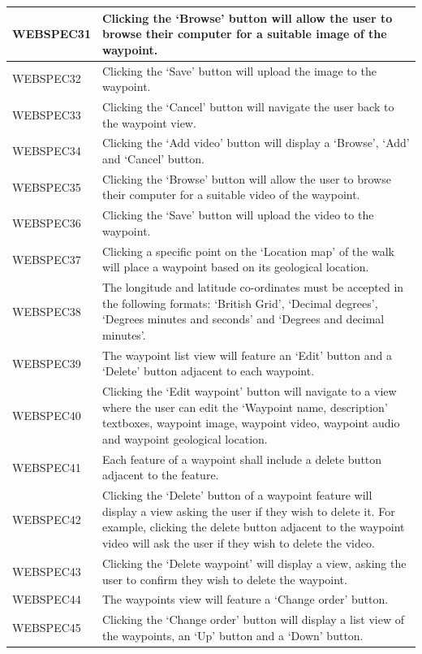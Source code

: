 \documentclass[11pt,a4paper]{article}
\begin{document}
\begin{longtable}{|p{2.5cm}p{13cm}|}
WEBSPEC31 & Clicking the `Browse' button will allow the user to browse their computer for a suitable image of the waypoint. \\ \hline
WEBSPEC32 & Clicking the `Save' button will upload the image to the waypoint. \\ \hline
WEBSPEC33 & Clicking the `Cancel' button will navigate the user back to the waypoint view. \\ \hline
WEBSPEC34 & Clicking the `Add video' button will display a `Browse', `Add' and `Cancel' button. \\ \hline
WEBSPEC35 & Clicking the `Browse' button will allow the user to browse their computer for a suitable video of the waypoint. \\ \hline
WEBSPEC36 & Clicking the `Save' button will upload the video to the waypoint. \\ \hline
WEBSPEC37 & Clicking a specific point on the `Location map' of the walk will place a waypoint based on its geological location. \\ \hline
WEBSPEC38 & The longitude and latitude co-ordinates must be accepted in the following formats: `British Grid', `Decimal degrees', `Degrees minutes and seconds' and `Degrees and decimal minutes'. \\ \hline
WEBSPEC39 & The waypoint list view will feature an `Edit' button and a `Delete' button adjacent to each waypoint. \\ \hline
WEBSPEC40 & Clicking the `Edit waypoint' button will navigate to a view where the user can edit the `Waypoint name, description' textboxes, waypoint image, waypoint video, waypoint audio and waypoint geological location. \\ \hline
WEBSPEC41 & Each feature of a waypoint shall include a delete button adjacent to the feature. \\ \hline
WEBSPEC42 & Clicking the `Delete' button of a waypoint feature will display a view asking the user if they wish to delete it. For example, clicking the delete button adjacent to the waypoint video will ask the user if they wish to delete the video. \\ \hline
WEBSPEC43 & Clicking the `Delete waypoint' will display a view, asking the user to confirm they wish to delete the waypoint. \\ \hline
WEBSPEC44 & The waypoints view will feature a `Change order' button. \\ \hline
WEBSPEC45 & Clicking the `Change order' button will display a list view of the waypoints, an `Up' button and a `Down' button. \\ \hline

\end{longtable}
\end{document}
